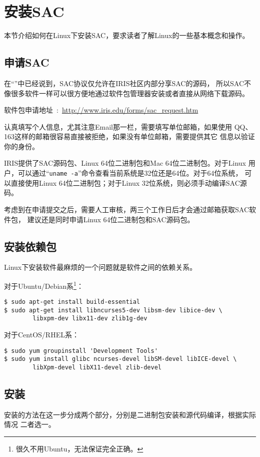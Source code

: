 \section{安装SAC}
\label{sec:sac-install}
本节介绍如何在Linux下安装SAC，要求读者了解Linux的一些基本概念和操作。

\subsection*{申请SAC}
在``''中已经说到，SAC协议仅允许在IRIS社区内部分享SAC的源码，
所以SAC不像很多软件一样可以很方便地通过软件包管理器安装或者直接从网络下载源码。

软件包申请地址~:~\url{http://www.iris.edu/forms/sac\_request.htm}

认真填写个人信息，尤其注意Email那一栏，需要填写单位邮箱，如果使用
QQ、163这样的邮箱很容易直接被拒绝，如果没有单位邮箱，需要提供其它
信息以验证你的身份。

IRIS提供了SAC源码包、Linux 64位二进制包和Mac 64位二进制包。对于Linux
用户，可以通过``\lstinline{uname -a}''命令查看当前系统是32位还是64位。对于64位系统，
可以直接使用Linux 64位二进制包；对于Linux 32位系统，则必须手动编译SAC源码。

考虑到在申请提交之后，需要人工审核，两三个工作日后才会通过邮箱获取SAC软件包，
建议还是同时申请Linux 64位二进制包和SAC源码包。

\subsection*{安装依赖包}
Linux下安装软件最麻烦的一个问题就是软件之间的依赖关系。

对于Ubuntu/Debian系\footnote{很久不用Ubuntu，无法保证完全正确。}：
\begin{lstlisting}[style=Shell]
$ sudo apt-get install build-essential
$ sudo apt-get install libncurses5-dev libsm-dev libice-dev \
        libxpm-dev libx11-dev zlib1g-dev
\end{lstlisting}

对于CentOS/RHEL系：
\begin{lstlisting}[style=Shell]
$ sudo yum groupinstall 'Development Tools'
$ sudo yum install glibc ncurses-devel libSM-devel libICE-devel \
        libXpm-devel libX11-devel zlib-devel 
\end{lstlisting}

\subsection*{安装}
安装的方法在这一步分成两个部分，分别是二进制包安装和源代码编译，根据实际情况
二者选一。
